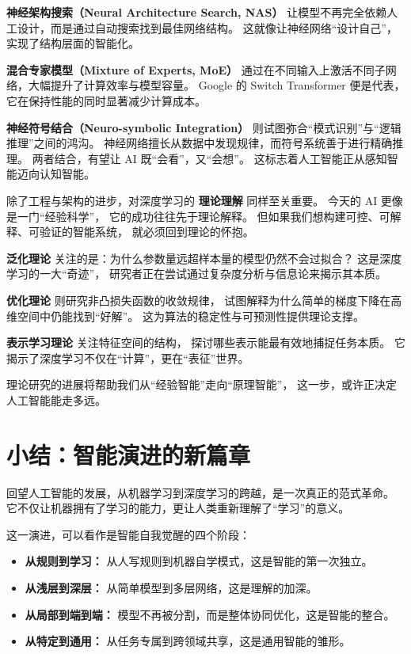 {\bf 神经架构搜索（Neural Architecture Search, NAS）}  
让模型不再完全依赖人工设计，而是通过自动搜索找到最佳网络结构。  
这就像让神经网络“设计自己”，实现了结构层面的智能化。  

{\bf 混合专家模型（Mixture of Experts, MoE）}  
通过在不同输入上激活不同子网络，大幅提升了计算效率与模型容量。  
Google 的 Switch Transformer 便是代表，它在保持性能的同时显著减少计算成本。  

{\bf 神经符号结合（Neuro-symbolic Integration）}  
则试图弥合“模式识别”与“逻辑推理”之间的鸿沟。  
神经网络擅长从数据中发现规律，而符号系统善于进行精确推理。  
两者结合，有望让 AI 既“会看”，又“会想”。  
这标志着人工智能正从感知智能迈向认知智能。

除了工程与架构的进步，对深度学习的 {\bf 理论理解} 同样至关重要。  
今天的 AI 更像是一门“经验科学”，  
它的成功往往先于理论解释。  
但如果我们想构建可控、可解释、可验证的智能系统，  
就必须回到理论的怀抱。  

{\bf 泛化理论} 关注的是：为什么参数量远超样本量的模型仍然不会过拟合？  
这是深度学习的一大“奇迹”，  
研究者正在尝试通过复杂度分析与信息论来揭示其本质。  

{\bf 优化理论} 则研究非凸损失函数的收敛规律，  
试图解释为什么简单的梯度下降在高维空间中仍能找到“好解”。  
这为算法的稳定性与可预测性提供理论支撑。  

{\bf 表示学习理论} 关注特征空间的结构，  
探讨哪些表示能最有效地捕捉任务本质。  
它揭示了深度学习不仅在“计算”，更在“表征”世界。  

理论研究的进展将帮助我们从“经验智能”走向“原理智能”，  
这一步，或许正决定人工智能能走多远。

\section{小结：智能演进的新篇章}

回望人工智能的发展，从机器学习到深度学习的跨越，是一次真正的范式革命。  
它不仅让机器拥有了学习的能力，更让人类重新理解了“学习”的意义。  

这一演进，可以看作是智能自我觉醒的四个阶段：  
\begin{itemize}
\item {\bf 从规则到学习：} 从人写规则到机器自学模式，这是智能的第一次独立。  
\item {\bf 从浅层到深层：} 从简单模型到多层网络，这是理解的加深。  
\item {\bf 从局部到端到端：} 模型不再被分割，而是整体协同优化，这是智能的整合。  
\item {\bf 从特定到通用：} 从任务专属到跨领域共享，这是通用智能的雏形。  
\end{itemize}

